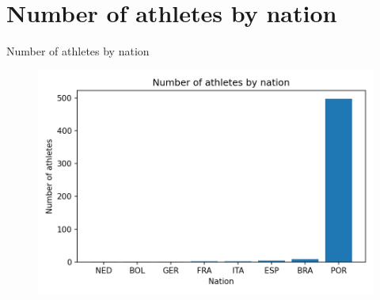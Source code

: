 \documentclass[aspectratio=169,xcolor=dvipsnames]{beamer}
\begin{document}
\section{Number of athletes by nation}
\begin{frame}{Number of athletes by nation}
    \begin{figure}[H]
        \centering
        \includegraphics[width=.7\textwidth]{img/athletesbynation.png}
    \end{figure}
\end{frame}
\end{document}
